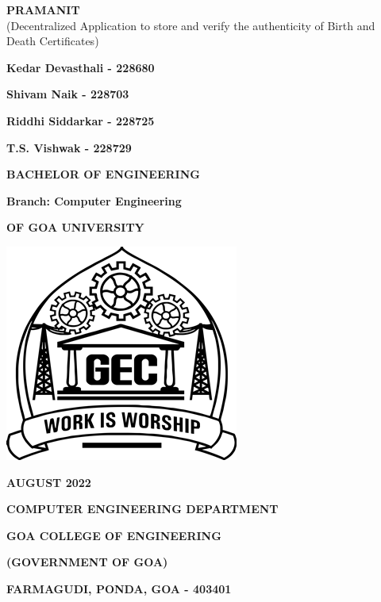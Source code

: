 \thispagestyle{empty}
\begin{center}
	\begin{minipage}{0.75\linewidth}
		\centering
		
		{\uppercase{\Huge \textbf{PRAMANIT\\}}}
	\large{(Decentralized Application to store and verify the authenticity of Birth and Death Certificates)\\}
\vspace{1cm}
{\LARGE \textbf{  Kedar Devasthali - 228680} \par }
{\LARGE \textbf{ Shivam Naik - 228703} \par}
{\LARGE \textbf{ Riddhi  Siddarkar - 228725} \par}
{\LARGE \textbf{ T.S. Vishwak - 228729} \par}
\vspace{1cm}
\end{minipage}
\end{center}


		\begin{center}
			
			\vspace{.8cm}
			{\Large \textbf{BACHELOR OF ENGINEERING}\par}
			{\Large \textbf{Branch: Computer Engineering}\par}
			\vspace{.8cm}
			
			
			{\Large \textbf {OF GOA UNIVERSITY}\par}
			
			\vspace{1cm}
			\includegraphics[width=0.2\linewidth]{gecLogo.png}
			\par
			
			\vspace{1cm}
			{\Large \textbf{AUGUST 2022}\par}
			\vspace{1cm}
			{\Large \textbf{COMPUTER ENGINEERING DEPARTMENT} \par}
			\vspace{0.3cm}
			{\Large \textbf{GOA COLLEGE OF ENGINEERING} \par}
			{\textbf{(GOVERNMENT OF GOA)} \par}
			{\Large \textbf{FARMAGUDI, PONDA, GOA - 403401} \par}
		
		\end{center}
			\clearpage

